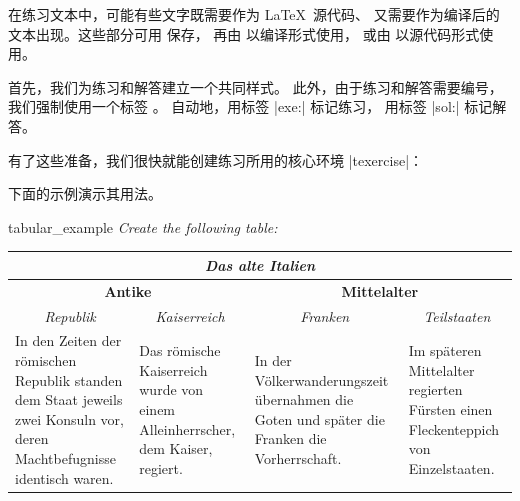 在练习文本中，可能有些文字既需要作为 \LaTeX\ 源代码、
又需要作为编译后的文本出现。这些部分可用  保存，
再由  以编译形式使用，
或由  以源代码形式使用。

首先，我们为练习和解答建立一个共同样式。
此外，由于练习和解答需要编号，我们强制使用一个标签 。
自动地，用标签 |exe:| 标记练习，
用标签 |sol:| 标记解答。

\begin{dispListing}
\end{dispListing}
\tcbusetemp

有了这些准备，我们很快就能创建练习所用的核心环境 |texercise|：


\clearpage
下面的示例演示其用法。

\begin{dispListing}
\tcbstartrecording
\end{dispListing}
\tcbusetemp


\begin{dispExample}
\begin{texercise}{tabular_example}
\textit{Create the following table:}\par\smallskip%
\begin{tcboutputlisting}
\begin{tabular}{|p{3cm}|p{3cm}|p{3cm}|p{3cm}|}\hline
\multicolumn{4}{|c|}{\bfseries\itshape Das alte Italien}\\\hline
\multicolumn{2}{|c|}{\bfseries Antike} &
\multicolumn{2}{c|}{\bfseries Mittelalter}\\\hline
\multicolumn{1}{|c|}{\itshape Republik}&
\multicolumn{1}{c|}{\itshape Kaiserreich}&
\multicolumn{1}{c|}{\itshape Franken}&
\multicolumn{1}{c|}{\itshape Teilstaaten}\\\hline
In den Zeiten der r\"{o}mischen Republik standen dem Staat jeweils zwei
Konsuln vor, deren Machtbefugnisse identisch waren. &
Das r\"{o}mische Kaiserreich wurde von einem Alleinherrscher, dem Kaiser,
regiert.
& In der V\"{o}lkerwanderungszeit \"{u}bernahmen die Goten und sp\"{a}ter die
Franken die Vorherrschaft.
& Im sp\"{a}teren Mittelalter regierten F\"{u}rsten einen Fleckenteppich
von Einzelstaaten.\\\hline
\end{tabular}
\end{tcboutputlisting}
\tcbuselistingtext%
\end{texercise}
\end{dispExample}



